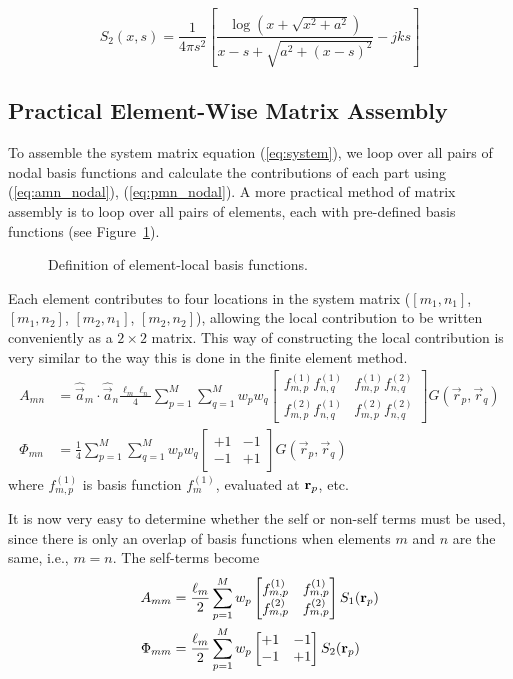 \begin{equation}
	S_2(x, s) = \frac{1}{4\pi s^2} \left[ \frac{\log\left( x + \sqrt{x^2 + a^2} \right)}{x - s + \sqrt{a^2 + (x - s)^2}} - j k s\right]
\end{equation}

\subsection{Practical Element-Wise Matrix Assembly}
To assemble the system matrix equation (\ref{eq:system}), we loop over all pairs of nodal basis functions and calculate the contributions of each part using (\ref{eq:amn_nodal}), (\ref{eq:pmn_nodal}). A more practical method of matrix assembly is to loop over all pairs of elements, each with pre-defined basis functions (see Figure~\ref{fig:mom_basis4}).
\begin{figure}
	\centering
	
	\caption{Definition of element-local basis functions.}
	\label{fig:mom_basis4}
\end{figure}

Each element contributes to four locations in the system matrix ($[m_1, n_1]$, $[m_1, n_2]$, $[m_2, n_1]$, $[m_2, n_2]$), allowing the local contribution to be written conveniently as a $2 \times 2$ matrix. This way of constructing the local contribution is very similar to the way this is done in the finite element method.
\begin{align}
	A_{mn} & = \hat{\vec{a}}_m \cdot \hat{\vec{a}}_n \frac{\ell_m \ell_n}{4} \sum_{p = 1}^M \sum_{q = 1}^M w_p w_q \begin{bmatrix}
		f_{m,p}^{(1)} f_{n,q}^{(1)} & f_{m,p}^{(1)} f_{n,q}^{(2)} \\
		f_{m,p}^{(2)} f_{n,q}^{(1)} & f_{m,p}^{(2)} f_{n,q}^{(2)}
	\end{bmatrix} G(\vec{r}_p, \vec{r}_q) \\
	\Phi_{mn} & = \frac{1}{4} \sum_{p = 1}^M \sum_{q = 1}^M w_p w_q \begin{bmatrix}
		+1 & -1 \\ -1 & +1
	\end{bmatrix} G(\vec{r}_p, \vec{r}_q)
\end{align}
where $f_{m,p}^{(1)}$ is basis function $f_m^{(1)}$, evaluated at $\mathbf{r}_p$, etc. 

It is now very easy to determine whether the self or non-self terms must be used, since there is only an overlap of basis functions when elements $m$ and $n$ are the same, i.e., $m = n$. The self-terms become
\begin{align}
	A_{mm} & = \frac{\ell_m}{2} \sum_{p = 1}^M w_p \begin{bmatrix}
		f_{m,p}^{(1)} & f_{m,p}^{(1)} \\
		f_{m,p}^{(2)} & f_{m,p}^{(2)}
	\end{bmatrix} S_1(\mathbf{r}_p) \\
	\Phi_{mm} & = \frac{\ell_m}{2} \sum_{p = 1}^M w_p \begin{bmatrix}
		+1 & -1 \\ -1 & +1
	\end{bmatrix} S_2(\mathbf{r}_p)
\end{align}


